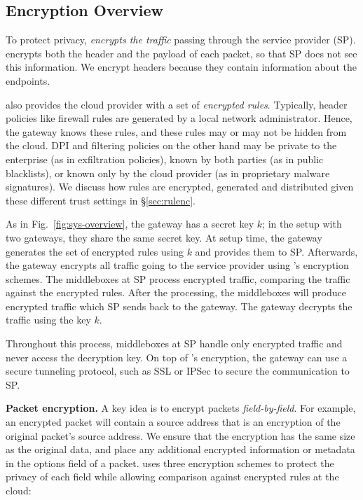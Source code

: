 \subsection{Encryption Overview}



To protect privacy, \sys \textit{encrypts  the traffic} passing through the service provider (SP).
\sys encrypts both the header and the payload  of each packet, so that SP does not see this information. We encrypt headers because they contain information about the endpoints. 

\sys also provides the cloud provider with a set of {\it encrypted rules}.
Typically, header policies like firewall rules are generated by a local network administrator. Hence, the gateway knows these rules, and these rules may or may not be hidden from the cloud.
DPI and filtering policies on the other hand may be private to the enterprise (as in exfiltration policies), known by both parties (as in  public blacklists), or known only by the cloud provider (as in proprietary malware signatures).
We discuss how rules are encrypted, generated and distributed given these different trust settings in \S\ref{sec:rulenc}.

As in Fig.~\ref{fig:sys-overview}, the gateway has a secret key $k$; in the setup with two gateways, they share
the same secret key. 
At setup time, the gateway generates the set of encrypted rules using $k$ and provides them to SP.
Afterwards, the gateway encrypts all traffic going to the service provider using \sys's encryption schemes.
The middleboxes at SP process  encrypted traffic, comparing the traffic against the encrypted rules. 
After the processing, the middleboxes
will produce encrypted traffic which SP sends back to the gateway. The gateway decrypts the traffic using the key $k$.

Throughout this process, middleboxes at SP handle only encrypted traffic and never access the decryption key. 
On top of \sys's encryption, the gateway can use a secure tunneling protocol, such as SSL or IPSec to secure the communication to SP.




\noindent\textbf{Packet encryption.}
A key idea is to encrypt packets {\it field-by-field}. For example,  an encrypted packet will contain a source address that is an encryption of the original packet's source address. We ensure that the encryption has the same size as the original data, and place any additional encrypted information or metadata in the options field of a packet. 
%
\sys uses three encryption schemes to protect the privacy of each field while allowing comparison against encrypted rules at the cloud: 

